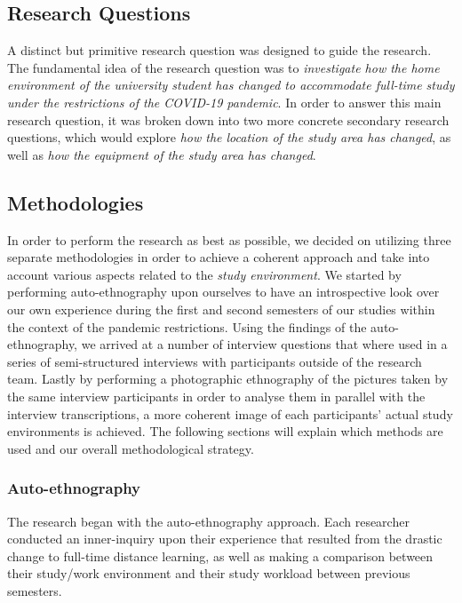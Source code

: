 \documentclass{sigchi}
\begin{document}
\subsection{Research Questions}

A distinct but primitive research question was designed to guide the research. The fundamental idea of the research question was to \textit{investigate how the home environment of the university student has changed to accommodate full-time study under the restrictions of the COVID-19 pandemic}. In order to answer this main research question, it was broken down into two more concrete secondary research questions, which would explore \textit{how the location of the study area has changed}, as well as \textit{how the equipment of the study area has changed}. 

\subsection{Methodologies}
In order to perform the research as best as possible, we decided on utilizing three separate methodologies in order to achieve a coherent approach and take into account various aspects related to the \emph{study environment}. We started by performing auto-ethnography upon ourselves to have an introspective look over our own experience during the first and second semesters of our studies within the context of the pandemic restrictions. Using the findings of the auto-ethnography, we arrived at a number of interview questions that where used in a series of semi-structured interviews with participants outside of the research team. Lastly by performing a photographic ethnography of the pictures taken by the same interview participants in order to analyse them in parallel with the interview transcriptions, a more coherent image of each participants' actual study environments is achieved. The following sections will explain which methods are used and our overall methodological strategy.

\subsubsection{Auto-ethnography}

The research began with the auto-ethnography \cite{adams_ellis_jones_2017, dighe_joshi_2014} approach. Each researcher conducted an inner-inquiry upon their experience that resulted from the drastic change to full-time distance learning, as well as making a comparison between their study/work environment and their study workload between previous semesters.
\end{document}
